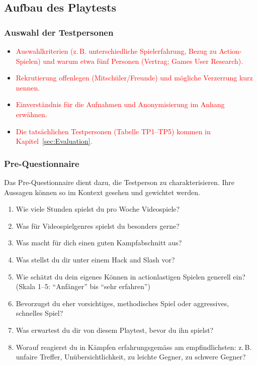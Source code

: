 \documentclass[../Main.tex]{subfiles}
\begin{document}
\subsection{Aufbau des Playtests}

\subsubsection{Auswahl der Testpersonen} \label{sec:AuswahlTP}

\begin{itemize}[leftmargin=1.5cm]
    \item \textcolor{red}{Auswahlkriterien (z.\,B. unterschiedliche Spielerfahrung, Bezug zu Action-Spielen) und warum etwa fünf Personen (Vertrag; Games User Research).}
    \item \textcolor{red}{Rekrutierung offenlegen (Mitschüler/Freunde) und mögliche Verzerrung kurz nennen.}
    \item \textcolor{red}{Einverständnis für die Aufnahmen und Anonymisierung im Anhang erwähnen.}
    \item \textcolor{red}{Die tatsächlichen Testpersonen (Tabelle TP1--TP5) kommen in Kapitel~\ref{sec:Evaluation}.}
\end{itemize}

\subsubsection{Pre-Questionnaire} \label{sec:PreQuestionnaire}
 
Das Pre-Questionnaire dient dazu, die Testperson zu charakterisieren. Ihre Aussagen können so im Kontext gesehen und gewichtet werden.
 
\begin{enumerate}[label=\textbf{P\arabic*}, leftmargin=1.5cm, itemsep=0.5em]
    \item Wie viele Stunden spielst du pro Woche Videospiele?
    \item Was für Videospielgenres spielst du besonders gerne?
    \item Was macht für dich einen guten Kampfabschnitt aus?
    \item Was stellst du dir unter einem Hack and Slash vor?
    \item Wie schätzt du dein eigenes Können in actionlastigen Spielen generell ein? (Skala 1--5: \enquote{Anfänger} bis \enquote{sehr erfahren})
    \item Bevorzugst du eher vorsichtiges, methodisches Spiel oder aggressives, schnelles Spiel?
    \item Was erwartest du dir von diesem Playtest, bevor du ihn spielst?
    \item Worauf reagierst du in Kämpfen erfahrungsgemäss am empfindlichsten: z.\,B. unfaire Treffer, Unübersichtlichkeit, zu leichte Gegner, zu schwere Gegner?
\end{enumerate}
\end{document}
